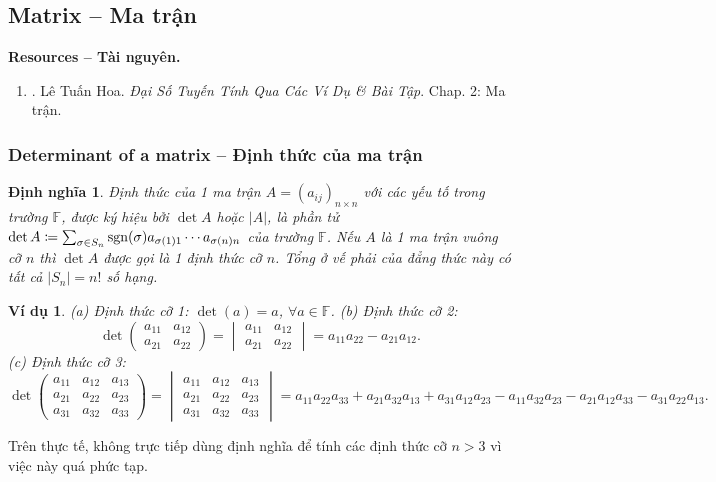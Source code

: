 \documentclass{article}
\newtheorem{dinhnghia}{Định nghĩa}
\newtheorem{vidu}{Ví dụ}
\begin{document}
\subsection{Matrix -- Ma trận}
\textbf{\textsf{Resources -- Tài nguyên.}}
\begin{enumerate}
	\item \cite{Hoa_linear_algebra}. {\sc Lê Tuấn Hoa}. {\it Đại Số Tuyến Tính Qua Các Ví Dụ \& Bài Tập}. Chap. 2: Ma trận.
\end{enumerate}

\subsubsection{Determinant of a matrix -- Định thức của ma trận}
\begin{dinhnghia}
	{\rm Định thức} của 1 ma trận $A = (a_{ij})_{n\times n}$ với các yếu tố trong trường $\mathbb{F}$, được ký hiệu bởi $\det A$ hoặc $|A|$, là phần tử $\det A\coloneqq\sum_{\sigma\in S_n} {\rm sgn}(\sigma)a_{\sigma(1)1}\cdots a_{\sigma(n)n}$ của trường $\mathbb{F}$. Nếu $A$ là 1 ma trận vuông cỡ $n$ thì $\det A$ được gọi là 1 {\rm định thức cỡ $n$}. Tổng ở vế phải của đẳng thức này có tất cả $|S_n| = n!$ số hạng.
\end{dinhnghia}

\begin{vidu}
	(a) Định thức cỡ 1: $\det(a) = a$, $\forall a\in\mathbb{F}$. (b) Định thức cỡ 2:
	\begin{equation*}
		\det\begin{pmatrix}
			a_{11} & a_{12}\\a_{21} & a_{22}
		\end{pmatrix} = \begin{vmatrix}
			a_{11} & a_{12}\\a_{21} & a_{22}
		\end{vmatrix} = a_{11}a_{22} - a_{21}a_{12}.
	\end{equation*}
	(c) Định thức cỡ 3:
	\begin{equation*}
		\det\begin{pmatrix}
			a_{11} & a_{12} & a_{13}\\a_{21} & a_{22} & a_{23}\\a_{31} & a_{32} & a_{33}
		\end{pmatrix} = \begin{vmatrix}
			a_{11} & a_{12} & a_{13}\\a_{21} & a_{22} & a_{23}\\a_{31} & a_{32} & a_{33}
		\end{vmatrix} = a_{11}a_{22}a_{33} + a_{21}a_{32}a_{13} + a_{31}a_{12}a_{23} - a_{11}a_{32}a_{23} - a_{21}a_{12}a_{33} - a_{31}a_{22}a_{13}.
	\end{equation*}
\end{vidu}
Trên thực tế, không trực tiếp dùng định nghĩa để tính các định thức cỡ $n > 3$ vì việc này quá phức tạp.
\end{document}

